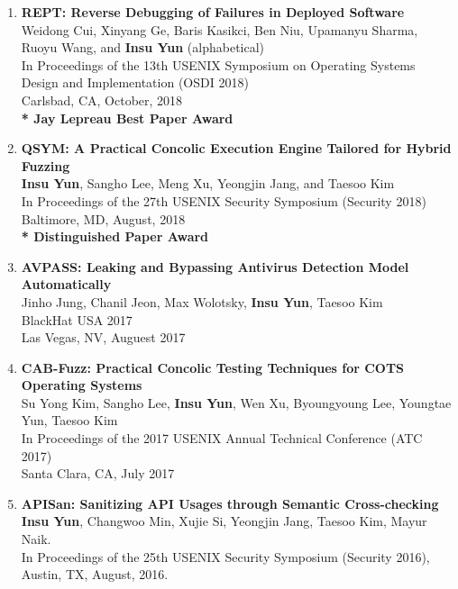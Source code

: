 \documentclass[11pt,letterpaper]{article}
\begin{document}
\begin{enumerate}
  \item \textbf{REPT: Reverse Debugging of Failures in Deployed Software} \\
  {\footnotesize
    Weidong Cui, Xinyang Ge, Baris Kasikci, Ben Niu, Upamanyu Sharma, Ruoyu Wang, and \textbf{Insu Yun} (alphabetical) \\
    In Proceedings of the 13th USENIX Symposium on Operating Systems Design and Implementation (OSDI 2018) \\
    Carlsbad, CA, October, 2018 \\
    \textbf{* Jay Lepreau Best Paper Award}
  }
  \item \textbf{QSYM: A Practical Concolic Execution Engine Tailored for Hybrid Fuzzing} \\
  {\footnotesize
    \textbf{Insu Yun}, Sangho Lee, Meng Xu, Yeongjin Jang, and Taesoo Kim \\
    In Proceedings of the 27th USENIX Security Symposium (Security 2018) \\
    Baltimore, MD, August, 2018 \\
    \textbf{* Distinguished Paper Award}
  }
  \item \textbf{AVPASS: Leaking and Bypassing Antivirus Detection Model Automatically} \\
  {\footnotesize
    Jinho Jung, Chanil Jeon, Max Wolotsky, \textbf{Insu Yun}, Taesoo Kim \\
    BlackHat USA 2017 \\
    Las Vegas, NV, Auguest 2017
  }
  \item \textbf{CAB-Fuzz: Practical Concolic Testing Techniques for COTS Operating Systems} \\
  {\footnotesize
    Su Yong Kim, Sangho Lee, \textbf{Insu Yun}, Wen Xu, Byoungyoung Lee, Youngtae Yun, Taesoo Kim \\
    In Proceedings of the 2017 USENIX Annual Technical Conference (ATC 2017) \\
    Santa Clara, CA, July 2017 
  }
  \item \textbf{APISan: Sanitizing API Usages through Semantic Cross-checking} \\
  {\footnotesize
     \textbf{Insu Yun}, Changwoo Min, Xujie Si, Yeongjin Jang, Taesoo Kim, Mayur Naik. \\
     In Proceedings of the 25th USENIX Security Symposium (Security 2016), \\
     Austin, TX, August, 2016. \\
}
\end{enumerate}
\end{document}
